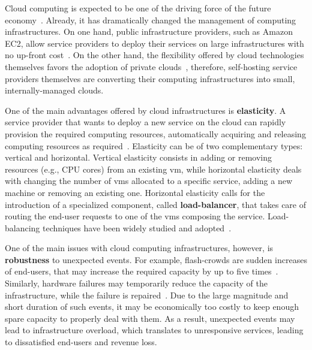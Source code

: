 Cloud computing is expected to be one of the driving force of the
future economy~\citep{WPonMckinsey13}. Already, it has dramatically
changed the management of computing infrastructures. On one hand,
public infrastructure providers, such as Amazon EC2, allow service
providers to deploy their services on large infrastructures with no
up-front cost~\citep{Buyya09:FGCS}. On the other hand, the flexibility
offered by cloud technologies themselves favors the adoption of
private clouds~\citep{Gulati11:HotCloud}, therefore, self-hosting
service providers themselves are converting their computing
infrastructures into small, internally-managed clouds.

One of the main advantages offered by cloud infrastructures is {\bf
  elasticity}. A service provider that wants to deploy a new service
on the cloud can rapidly provision the required computing resources,
automatically acquiring and releasing computing resources as
required~\citep{Herbst13:ICAC}.  Elasticity can be of two
complementary types: vertical and horizontal. Vertical elasticity
consists in adding or removing resources (e.g., CPU cores) from an
existing \ac{vm}, while horizontal elasticity deals with changing the
number of \acp{vm} allocated to a specific service, adding a new
machine or removing an existing one.
%
Horizontal elasticity calls for the introduction of a specialized
component, called {\bf load-balancer}, that takes care of routing the
end-user requests to one of the \acp{vm} composing the
service. Load-balancing techniques have been widely studied and
adopted~\citep{Barroso09,Lu11:PerfEval,Lin12:IGCC,BeesBased:ADAPTIVE}.

One of the main issues with cloud computing infrastructures, however,
is {\bf robustness} to unexpected events. For example, flash-crowds
are sudden increases of end-users, that may increase the required
capacity by up to five times~\citep{Bodik10:SoCC}. Similarly, hardware
failures may temporarily reduce the capacity of the infrastructure,
while the failure is repaired~\citep{Barroso09}. Due to the large
magnitude and short duration of such events, it may be economically
too costly to keep enough spare capacity to properly deal with
them. As a result, unexpected events may lead to infrastructure
overload, which translates to unresponsive services, leading to
dissatisfied end-users and revenue loss.

